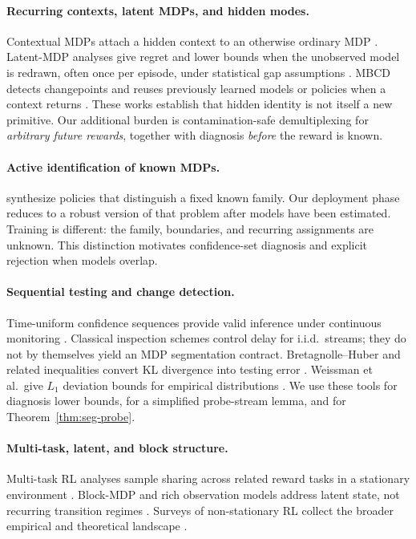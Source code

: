 \documentclass[11pt]{article}
\begin{document}
\paragraph{Recurring contexts, latent MDPs, and hidden modes.}
Contextual MDPs attach a hidden context to an otherwise ordinary MDP
\citep{hallak2015contextual}. Latent-MDP analyses give regret and lower bounds
when the unobserved model is redrawn, often once per episode, under
statistical gap assumptions \citep{kwon2021latent}. MBCD detects changepoints
and reuses previously learned models or policies when a context returns
\citep{alegre2021minimum}. These works establish that hidden identity is not
itself a new primitive. Our additional burden is contamination-safe
demultiplexing for \emph{arbitrary future rewards}, together with diagnosis
\emph{before} the reward is known.

\paragraph{Active identification of known MDPs.}
\citet{duan2021detection} synthesize policies that distinguish a fixed known
family. Our deployment phase reduces to a robust version of that problem after
models have been estimated. Training is different: the family, boundaries, and
recurring assignments are unknown. This distinction motivates confidence-set
diagnosis and explicit rejection when models overlap.

\paragraph{Sequential testing and change detection.}
Time-uniform confidence sequences provide valid inference under continuous
monitoring \citep{howard2021timeuniform}. Classical inspection schemes
\citep{page1954continuous,lorden1971procedures} control delay for i.i.d.\
streams; they do not by themselves yield an MDP segmentation contract.
Bretagnolle--Huber and related inequalities convert KL divergence into testing
error \citep{bretagnolle1978estimation,lecam1973convergence,canonne2023short,tsybakov2009introduction}.
Weissman et al.\ give $L_1$ deviation bounds for empirical distributions
\citep{weissman2003inequalities}. We use these tools for diagnosis lower
bounds, for a simplified probe-stream lemma, and for
Theorem~\ref{thm:seg-probe}.

\paragraph{Multi-task, latent, and block structure.}
Multi-task RL analyses sample sharing across related reward tasks in a
stationary environment \citep{brunskill2013sample}. Block-MDP and rich
observation models address latent state, not recurring transition regimes
\citep{misra2020block}. Surveys of non-stationary RL collect the broader
empirical and theoretical landscape \citep{padakandla2021survey}.
\end{document}
